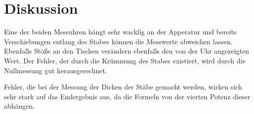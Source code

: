\section{Diskussion}
\label{sec:Diskussion}

Eine der beiden Messuhren hängt sehr wacklig an der Apperatur und bereits Verschiebungen entlang des Stabes können die Messwerte abweichen lassen.
Ebenfalls Stöße an den Tischen verändern ebenfalls den von der Uhr angezeigten Wert.
Der Fehler, der durch die Krümmung des Stabes existiert, wird durch die Nullmessung gut herausgerechnet.

Fehler, die bei der Messung der Dicken der Stäbe gemacht werden, wirken sich sehr stark auf das Endergebnis aus, da die Formeln von der vierten Potenz dieser abhängen.
